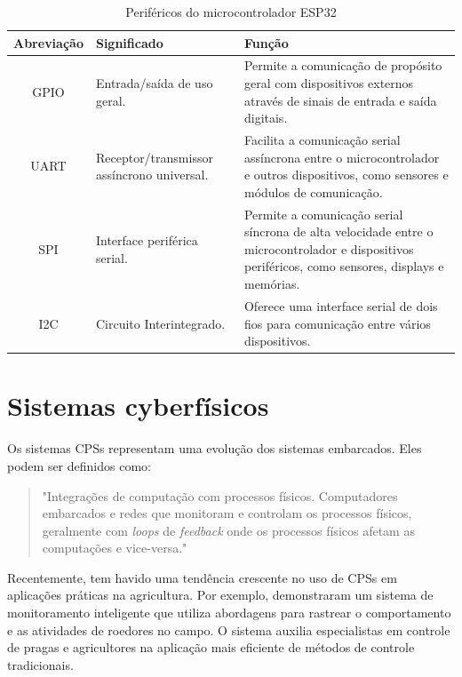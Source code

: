 \begin{table}[!htb]
  \caption{Periféricos do microcontrolador ESP32} \label{tab:esp32_perifericos}
  \begin{tabularx}{\textwidth}{|c|X|X|} \hline
    \textbf{Abreviação} & \textbf{Significado} & \textbf{Função} \\ \hline
    GPIO & Entrada/saída de uso geral. & Permite a comunicação de propósito geral com dispositivos externos através de sinais de entrada e saída digitais.  \\ \hline
    UART & Receptor/transmissor assíncrono universal. & Facilita a comunicação serial assíncrona entre o microcontrolador e outros dispositivos, como sensores e módulos de comunicação. \\ \hline
    SPI & Interface periférica serial. & Permite a comunicação serial síncrona de alta velocidade entre o microcontrolador e dispositivos periféricos, como sensores, displays e memórias. \\ \hline
    I2C & Circuito Interintegrado. & Oferece uma interface serial de dois fios para comunicação entre vários dispositivos. \\ \hline
  \end{tabularx}
\end{table}

\section{Sistemas cyberfísicos}

Os sistemas CPSs representam uma evolução dos sistemas embarcados. Eles podem ser definidos como:

\begin{quote}
"Integrações de computação com processos físicos. Computadores embarcados e redes que monitoram e controlam os processos físicos, geralmente com \textit{loops} de \textit{feedback} onde os processos físicos afetam as computações e vice-versa." \parencite[{p. 363}]{lee2008cyber}
\end{quote}

Recentemente, tem havido uma tendência crescente no uso de CPSs em aplicações práticas na agricultura. Por exemplo, \textcite{ahmad2020smart} demonstraram um sistema de monitoramento inteligente que utiliza abordagens para rastrear o comportamento e as atividades de roedores no campo. O sistema auxilia especialistas em controle de pragas e agricultores na aplicação mais eficiente de métodos de controle tradicionais.

